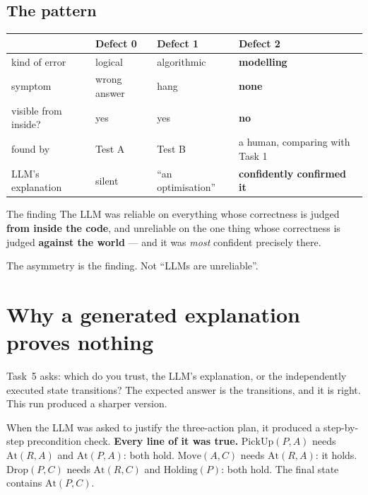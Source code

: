 \documentclass[11pt,a4paper]{article}
\begin{document}
\subsection{The pattern}

\begin{center}
\small
\begin{tabular}{@{}llll@{}}
\toprule
& \textbf{Defect 0} & \textbf{Defect 1} & \textbf{Defect 2} \\
\midrule
kind of error       & logical      & algorithmic & \textbf{modelling} \\
symptom             & wrong answer & hang        & \textbf{none} \\
visible from inside? & yes         & yes         & \textbf{no} \\
found by            & Test A       & Test B      & a human, comparing with Task 1 \\
LLM's explanation   & silent       & ``an optimisation'' & \textbf{confidently confirmed it} \\
\bottomrule
\end{tabular}
\end{center}

\begin{keyidea}{The finding}
The LLM was reliable on everything whose correctness is judged \textbf{from
inside the code}, and unreliable on the one thing whose correctness is judged
\textbf{against the world} --- and it was \emph{most} confident precisely there.

The asymmetry is the finding. Not ``LLMs are unreliable''.
\end{keyidea}

\section{Why a generated explanation proves nothing}

Task~5 asks: which do you trust, the LLM's explanation, or the independently
executed state transitions? The expected answer is the transitions, and it is
right. This run produced a sharper version.

When the LLM was asked to justify the three-action plan, it produced a
step-by-step precondition check. \textbf{Every line of it was true.}
$\mathrm{PickUp}(P,A)$ needs $\mathrm{At}(R,A)$ and $\mathrm{At}(P,A)$: both
hold. $\mathrm{Move}(A,C)$ needs $\mathrm{At}(R,A)$: it holds.
$\mathrm{Drop}(P,C)$ needs $\mathrm{At}(R,C)$ and $\mathrm{Holding}(P)$: both
hold. The final state contains $\mathrm{At}(P,C)$.
\end{document}
